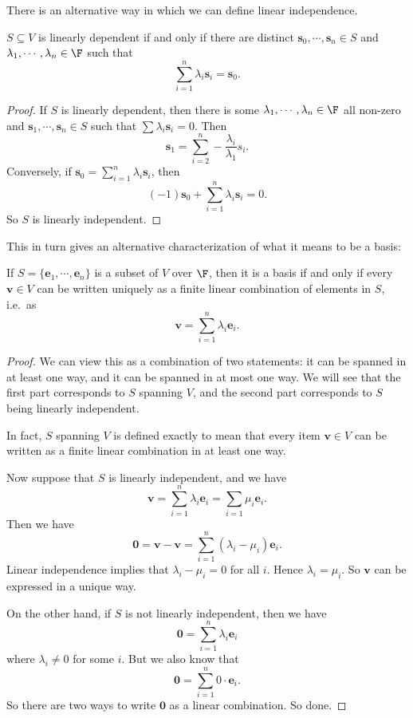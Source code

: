 \documentclass[a4paper]{article}
\begin{document}
There is an alternative way in which we can define linear independence.
\begin{lemma}
  $S\subseteq V$ is linearly dependent if and only if there are distinct $\mathbf{s}_0, \cdots, \mathbf{s}_n \in S$ and $\lambda_1, \cdots, \lambda_n\in \F$ such that
  \[
    \sum_{i = 1}^n \lambda_i \mathbf{s}_i = \mathbf{s}_0.
  \]
\end{lemma}

\begin{proof}
  If $S$ is linearly dependent, then there is some $\lambda_1, \cdots, \lambda_n \in \F$ all non-zero and $\mathbf{s}_1,\cdots, \mathbf{s}_n \in S$ such that $\sum \lambda_i \mathbf{s}_i = 0$. Then
  \[
    \mathbf{s}_1 = \sum_{i = 2}^n -\frac{\lambda_i}{\lambda_1} s_i.
  \]
  Conversely, if $\mathbf{s}_0 = \sum_{i = 1}^n \lambda_i \mathbf{s}_i$, then
  \[
    (-1)\mathbf{s}_0 + \sum_{i = 1}^n \lambda_i \mathbf{s}_i = 0.
  \]
  So $S$ is linearly independent.
\end{proof}

This in turn gives an alternative characterization of what it means to be a basis:
\begin{prop}
  If $S = \{\mathbf{e}_1, \cdots, \mathbf{e}_n\}$ is a subset of $V$ over $\F$, then it is a basis if and only if every $\mathbf{v}\in V$ can be written uniquely as a finite linear combination of elements in $S$, i.e.\ as
  \[
    \mathbf{v} = \sum_{i = 1}^n \lambda_i \mathbf{e}_i.
  \]
\end{prop}

\begin{proof}
  We can view this as a combination of two statements: it can be spanned in at least one way, and it can be spanned in at most one way. We will see that the first part corresponds to $S$ spanning $V$, and the second part corresponds to $S$ being linearly independent.

  In fact, $S$ spanning $V$ is defined exactly to mean that every item $\mathbf{v}\in V$ can be written as a finite linear combination in at least one way.

  Now suppose that $S$ is linearly independent, and we have
  \[
    \mathbf{v} = \sum_{i = 1}^n \lambda_i \mathbf{e}_i = \sum_{i = 1}\mu_i \mathbf{e}_i.
  \]
  Then we have
  \[
    \mathbf{0} = \mathbf{v} - \mathbf{v} = \sum_{i = 1}^n (\lambda_i - \mu_i) \mathbf{e}_i.
  \]
  Linear independence implies that $\lambda_i - \mu_i = 0$ for all $i$. Hence $\lambda_i = \mu_i$. So $\mathbf{v}$ can be expressed in a unique way.

  On the other hand, if $S$ is not linearly independent, then we have
  \[
    \mathbf{0} = \sum_{i = 1}^n \lambda_i \mathbf{e}_i
  \]
  where $\lambda_i \not= 0$ for some $i$. But we also know that
  \[
    \mathbf{0} = \sum_{i = 1}^n 0\cdot \mathbf{e}_i.
  \]
  So there are two ways to write $\mathbf{0}$ as a linear combination. So done.
\end{proof}
\end{document}

